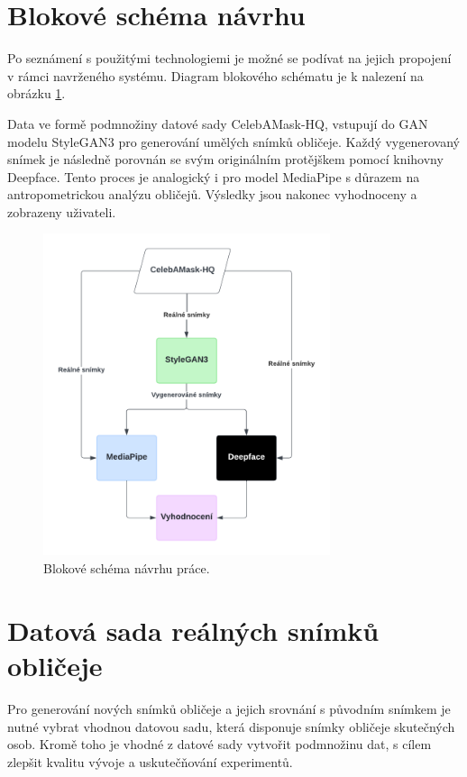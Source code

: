 \section{Blokové schéma návrhu}

Po seznámení s použitými technologiemi je možné se podívat na jejich propojení v rámci navrženého systému. Diagram blokového schématu je k nalezení na obrázku \ref{fig:design-diagram}.

Data ve formě podmnožiny datové sady CelebAMask-HQ, vstupují do GAN modelu StyleGAN3 pro generování umělých snímků obličeje. Každý vygenerovaný snímek je následně porovnán se svým originálním protějškem pomocí knihovny Deepface. Tento proces je analogický i pro model MediaPipe s důrazem na antropometrickou analýzu obličejů. Výsledky jsou nakonec vyhodnoceny a zobrazeny uživateli.

\begin{figure}[hbt]
	\centering
	\includegraphics[width=0.75\textwidth]{obrazky-figures/design-block-diagram.png}
	\caption{Blokové schéma návrhu práce.}
        \label{fig:design-diagram}
\end{figure}

\section{Datová sada reálných snímků obličeje}


Pro generování nových snímků obličeje a jejich srovnání s původním snímkem je nutné vybrat vhodnou datovou sadu, která disponuje snímky obličeje skutečných osob. Kromě toho je vhodné z datové sady vytvořit podmnožinu dat, s cílem zlepšit kvalitu vývoje a uskutečňování experimentů.

